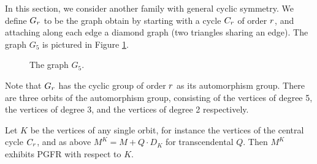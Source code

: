 In this section, we consider another family with general cyclic symmetry.  We define $G_{r}$ to be the graph obtain by starting with a cycle $C_{r}$ of order $r$, and attaching along each edge a diamond graph (two triangles sharing an edge).  The graph $G_5$ is pictured in Figure \ref{fig:cycle_diamond}.
\begin{figure}
\begin{center}
\end{center}
\caption{The graph $G_5$.}\label{fig:cycle_diamond}
\end{figure}
Note that $G_r$ has the cyclic group of order $r$ as its automorphism group.  There are three orbits of the automorphism group, consisting of the vertices of degree 5, the vertices of degree 3, and the vertices of degree 2 respectively.  

\begin{theorem}
Let $K$ be the vertices of any single orbit, for instance the vertices of the central cycle $C_r$, and as above $M^K=M+Q\cdot D_K$ for transcendental $Q$.  Then $M^K$ exhibits PGFR with respect to $K$.
\end{theorem}

